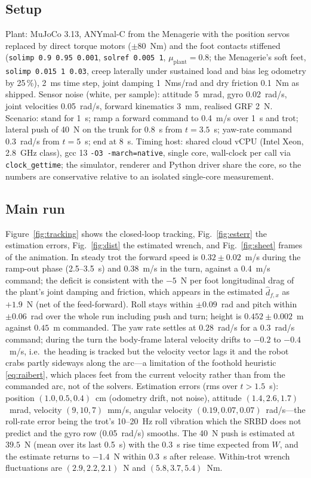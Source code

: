 \documentclass[11pt]{article}
\newcommand{\ie}{i.e.}\newcommand{\eg}{e.g.}
\begin{document}
\subsection{Setup}
Plant: MuJoCo 3.13, ANYmal-C from the Menagerie with the position servos replaced by direct torque motors ($\pm80$~Nm) and the foot contacts stiffened (\texttt{solimp 0.9 0.95 0.001}, \texttt{solref 0.005 1}, $\mu_{\mathrm{plant}}=0.8$; the Menagerie's soft feet, \texttt{solimp 0.015 1 0.03}, creep laterally under sustained load and bias leg odometry by 25\,\%), 2~ms time step, joint damping 1~Nms/rad and dry friction 0.1~Nm as shipped. Sensor noise (white, per sample): attitude 5~mrad, gyro 0.02~rad/s, joint velocities 0.05~rad/s, forward kinematics 3~mm, realised GRF 2~N. Scenario: stand for 1~s; ramp a forward command to 0.4~m/s over 1~s and trot; lateral push of 40~N on the trunk for 0.8~s from $t=3.5$~s; yaw-rate command 0.3~rad/s from $t=5$~s; end at 8~s. Timing host: shared cloud vCPU (Intel Xeon, 2.8~GHz class), gcc 13 \texttt{-O3 -march=native}, single core, wall-clock per call via \texttt{clock\_gettime}; the simulator, renderer and Python driver share the core, so the numbers are conservative relative to an isolated single-core measurement.

\subsection{Main run}
Figure~\ref{fig:tracking} shows the closed-loop tracking, Fig.~\ref{fig:esterr} the estimation errors, Fig.~\ref{fig:dist} the estimated wrench, and Fig.~\ref{fig:sheet} frames of the animation. In steady trot the forward speed is $0.32\pm0.02$~m/s during the ramp-out phase (2.5--3.5~s) and $0.38$~m/s in the turn, against a 0.4~m/s command; the deficit is consistent with the $-5$~N per foot longitudinal drag of the plant's joint damping and friction, which appears in the estimated $\hat d_{f,x}$ as $+1.9$~N (net of the feed-forward). Roll stays within $\pm0.09$~rad and pitch within $\pm0.06$~rad over the whole run including push and turn; height is $0.452\pm0.002$~m against $0.45$~m commanded. The yaw rate settles at $0.28$~rad/s for a 0.3~rad/s command; during the turn the body-frame lateral velocity drifts to $-0.2$ to $-0.4$~m/s, \ie\ the heading is tracked but the velocity vector lags it and the robot crabs partly sideways along the arc---a limitation of the foothold heuristic \eqref{eq:raibert}, which places feet from the current velocity rather than from the commanded arc, not of the solvers. Estimation errors (rms over $t>1.5$~s): position $(1.0,0.5,0.4)$~cm (odometry drift, not noise), attitude $(1.4,2.6,1.7)$~mrad, velocity $(9,10,7)$~mm/s, angular velocity $(0.19,0.07,0.07)$~rad/s---the roll-rate error being the trot's 10--20~Hz roll vibration which the SRBD does not predict and the gyro row (0.05~rad/s) smooths. The 40~N push is estimated at $39.5$~N (mean over its last 0.5~s) with the $0.3$~s rise time expected from $W$, and the estimate returns to $-1.4$~N within 0.3~s after release. Within-trot wrench fluctuations are $(2.9,2.2,2.1)$~N and $(5.8,3.7,5.4)$~Nm.
\end{document}

